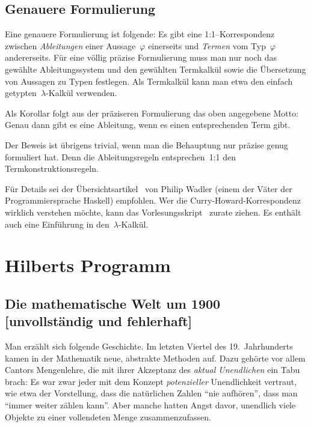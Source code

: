 \documentclass[a4paper,ngerman,12pt]{scrartcl}
\theoremstyle{definition}
\theoremstyle{plain}
\theoremstyle{remark}
\renewcommand{\_}{\mathpunct{.}\,}
\newcommand{\?}{\,{:}\,}
\begin{document}
\subsection{Genauere Formulierung}

Eine genauere Formulierung ist folgende: Es gibt eine 1:1--Korrespondenz
zwischen \emph{Ableitungen} einer Aussage~$\varphi$ einerseits und
\emph{Termen} vom Typ~$\varphi$ andererseits. Für eine völlig präzise
Formulierung muss man nur noch das gewählte Ableitungssystem und den gewählten
Termkalkül sowie die
Übersetzung von Aussagen zu Typen festlegen. Als Termkalkül kann man etwa den
einfach getypten~$\lambda$-Kalkül verwenden.

Als Korollar folgt aus der präziseren Formulierung das oben angegebene Motto:
Genau dann gibt es eine Ableitung, wenn es einen entsprechenden Term gibt.

Der Beweis ist übrigens trivial, wenn man die Behauptung nur präzise genug
formuliert hat. Denn die Ableitungsregeln entsprechen~1:1 den
Termkonstruktionsregeln.

Für Details sei der Übersichtsartikel~\cite{wadler:curry-howard} von Philip
Wadler (einem der Väter der Pro\-gram\-mier\-spra\-che Haskell) empfohlen. Wer die
Curry-Howard-Korrespondenz wirklich verstehen möchte, kann das
Vorlesungsskript~\cite{sorensen:urzyczyn:curryhoward} zurate ziehen. Es enthält
auch eine Einführung in den~$\lambda$-Kalkül.


\section{Hilberts Programm}

\subsection[Die mathematische Welt um 1900]{Die mathematische Welt um 1900
\qquad\small[unvollständig und fehlerhaft]}

Man erzählt sich folgende Geschichte. Im letzten Viertel des 19.~Jahrhunderts
kamen in der Mathematik neue, abstrakte Methoden auf. Dazu gehörte vor allem
Cantors Mengenlehre, die mit ihrer Akzeptanz des \emph{aktual Unendlichen} ein
Tabu brach: Es war zwar jeder mit dem Konzept \emph{potenzieller} Unendlichkeit
vertraut, wie etwa der Vorstellung, dass die natürlichen Zahlen "`nie
aufhören"', dass man "`immer weiter zählen kann"'. Aber manche hatten Angst
davor, unendlich viele Objekte zu einer vollendeten Menge zusammenzufassen.
\end{document}
